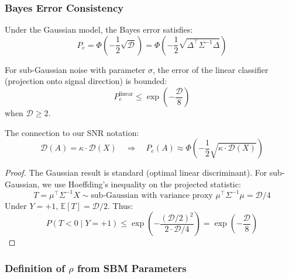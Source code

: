 \subsubsection{Bayes Error Consistency}

\begin{proposition}
\label{prop:bayes_error_consistent}
Under the Gaussian model, the Bayes error satisfies:
\begin{equation}
    P_e = \Phi\left(-\frac{1}{2}\sqrt{\mathcal{D}}\right) = \Phi\left(-\frac{1}{2}\sqrt{\Delta^\top \Sigma^{-1} \Delta}\right)
\end{equation}

For sub-Gaussian noise with parameter $\sigma$, the error of the linear classifier (projection onto signal direction) is bounded:
\begin{equation}
    P_e^{\mathrm{linear}} \leq \exp\left(-\frac{\mathcal{D}}{8}\right)
\end{equation}
when $\mathcal{D} \geq 2$.

The connection to our SNR notation:
\begin{equation}
    \mathcal{D}(A) = \kappa \cdot \mathcal{D}(X) \quad \Rightarrow \quad P_e(A) \approx \Phi\left(-\frac{1}{2}\sqrt{\kappa \cdot \mathcal{D}(X)}\right)
\end{equation}
\end{proposition}

\begin{proof}
The Gaussian result is standard (optimal linear discriminant). For sub-Gaussian, we use Hoeffding's inequality on the projected statistic:
\begin{equation}
    T = \mu^\top \Sigma^{-1} X \sim \text{sub-Gaussian with variance proxy } \mu^\top \Sigma^{-1} \mu = \mathcal{D}/4
\end{equation}
Under $Y = +1$, $\mathbb{E}[T] = \mathcal{D}/2$. Thus:
\begin{equation}
    P(T < 0 \mid Y = +1) \leq \exp\left(-\frac{(\mathcal{D}/2)^2}{2 \cdot \mathcal{D}/4}\right) = \exp\left(-\frac{\mathcal{D}}{8}\right)
\end{equation}
\end{proof}

\subsubsection{Definition of $\rho$ from SBM Parameters}

